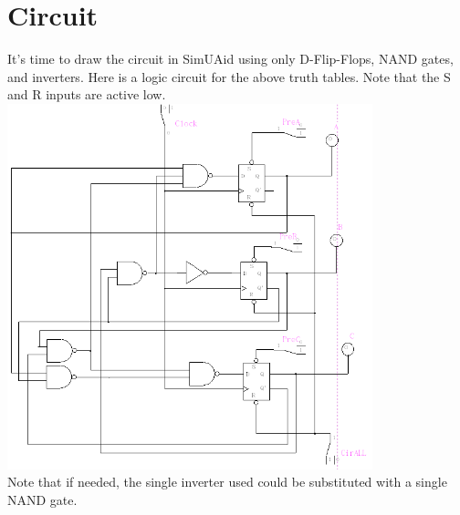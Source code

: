 \documentclass{report}
\begin{document}
\newpage
\section{Circuit}
It's time to draw the circuit in SimUAid using only D-Flip-Flops, NAND gates,
and inverters. Here is a logic circuit for the above truth tables. Note that
the S and R inputs are active low.
\\
\includegraphics[width=400px]{ckt}
\\
Note that if needed, the single inverter used could be substituted with a single NAND gate.
\end{document}
